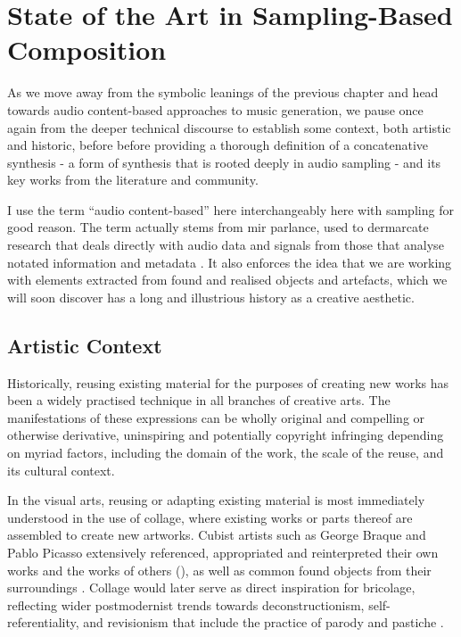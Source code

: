 \chapter{State of the Art in Sampling-Based Composition}
\label{chap:sota}

As we move away from the symbolic leanings of the previous chapter and head towards audio content-based approaches to music generation, we pause once again from the deeper technical discourse to establish some context, both artistic and historic, before before providing a thorough definition of a concatenative synthesis - a form of synthesis that is rooted deeply in audio sampling - and its key works from the literature and community.

I use the term ``audio content-based'' here interchangeably here with sampling for good reason. The term actually stems from \acrshort{mir} parlance, used to dermarcate research that deals  directly with audio data and signals from those that analyse notated information and metadata \citep{Veltkamp2008, Casey2008a}. It also enforces the idea that we are working with elements extracted from found and realised objects and artefacts, which we will soon discover has a long and illustrious history as a creative aesthetic.  

\section{Artistic Context}

Historically, reusing existing material for the purposes of creating new works has been a widely practised technique in all branches of creative arts. The manifestations of these expressions can be wholly original and compelling or otherwise derivative, uninspiring and potentially copyright infringing depending on myriad factors, including the domain of the work, the scale of the reuse, and its cultural context.

In the visual arts, reusing or adapting existing material is most immediately understood in the use of collage, where existing works or parts thereof are assembled to create new artworks. Cubist artists such as George Braque and Pablo Picasso extensively referenced, appropriated and reinterpreted their own works and the works of others (), as well as common found objects from their surroundings \citep{Greenberg1971}. Collage would later serve as direct inspiration for bricolage, reflecting wider postmodernist trends towards deconstructionism, self-referentiality,  and revisionism that include the practice of parody and pastiche \citep{Lochhead2002}. 

